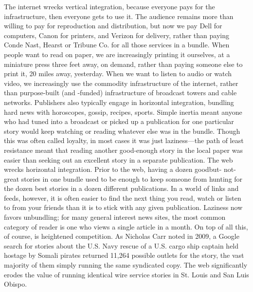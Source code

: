 The internet wrecks vertical integration, because everyone pays for the infrastructure,
then everyone gets to use it. The audience remains more than willing
to pay for reproduction and distribution, but now we pay Dell for computers,
Canon for printers, and Verizon for delivery, rather than paying Conde Nast,
Hearst or Tribune Co. for all those services in a bundle.
When people want to read on paper, we are increasingly printing it ourselves,
at a miniature press three feet away, on demand, rather than paying someone
else to print it, 20 miles away, yesterday. When we want to listen to audio or
watch video, we increasingly use the commodity infrastructure of the internet,
rather than purpose-built (and -funded) infrastructure of broadcast towers and
cable networks.
Publishers also typically engage in horizontal integration, bundling hard news
with horoscopes, gossip, recipes, sports. Simple inertia meant anyone who had
tuned into a broadcast or picked up a publication for one particular story would
keep watching or reading whatever else was in the bundle. Though this was often
called loyalty, in most cases it was just laziness—the path of least resistance meant
that reading another good-enough story in the local paper was easier than seeking
out an excellent story in a separate publication.
The web wrecks horizontal integration. Prior to the web, having a dozen goodbut-
not-great stories in one bundle used to be enough to keep someone from
hunting for the dozen best stories in a dozen different publications. In a world of
links and feeds, however, it is often easier to find the next thing you read, watch
or listen to from your friends than it is to stick with any given publication. Laziness
now favors unbundling; for many general interest news sites, the most common
category of reader is one who views a single article in a month.
On top of all this, of course, is heightened competition. As Nicholas Carr noted
in 2009, a Google search for stories about the U.S. Navy rescue of a U.S. cargo
ship captain held hostage by Somali pirates returned 11,264 possible outlets for
the story, the vast majority of them simply running the same syndicated copy.
The web significantly erodes the value of running identical wire service stories
in St. Louis and San Luis Obispo.

